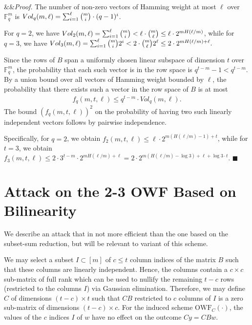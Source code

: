 \documentclass[orivec,envcountsect]{llncs}
\renewenvironment{proof}[1][]
    {\noindent
       \ifx&#1&{\it Proof.}
       \else{\it Proof ({#1}).}
       \fi}{\hfill $\blacksquare$}
\newcommand{\OWF}{\text{OWF}}
\begin{document}
\begin{proof}The number of non-zero vectors of Hamming weight at most $\ell$ over $\mathbb{F}_q^m$ is
$Vol_q(m,\ell) = \sum_{i=1}^\ell \tbinom{m}{i} \cdot (q-1)^{i}$.

For $q = 2$, we have
$Vol_2(m,\ell) = \sum_{i=1}^\ell \tbinom{m}{i} <
\ell \cdot \tbinom{m}{\ell} \leq
\ell \cdot 2^{m H(\ell/m)}$, while for $q = 3$, we have
$Vol_3(m,\ell) = \sum_{i=1}^\ell \tbinom{m}{i} 2^i <
2 \cdot \tbinom{m}{\ell} 2^\ell \leq
2 \cdot 2^{m H(\ell/m) + \ell}.$

Since the rows of $B$ span a uniformly chosen linear subspace of dimension $t$ over $\mathbb{F}_q^m$, the probability that each such vector is in the row space is $q^{t-m} - 1 < q^{t-m}$. By a union bound over all vectors of Hamming weight bounded by $\ell$, the probability that there exists such a vector in the row space of $B$ is at most
\begin{align*}
f_q(m,t,\ell) \leq q^{t-m} \cdot Vol_q(m,\ell).
\end{align*}
The bound $(f_q(m,t,\ell))^2$ on the probability of having two such linearly independent vectors follows by pairwise independence.

Specifically, for $q = 2$, we obtain
$f_2(m,t,\ell) \leq \ell \cdot 2^{m (H(\ell/m) - 1) + t}$,
while for $t = 3$, we obtain
$f_3(m,t,\ell) \leq 2 \cdot 3^{t-m} \cdot 2^{m H(\ell/m) + \ell} = 2 \cdot 2^{m (H(\ell/m) - \log 3) + \ell + \log 3 \cdot t}$.
\end{proof}



\section{Attack on the 2-3 OWF Based on Bilinearity}
\label{app:bilinearity}

We describe an attack that in not more efficient than the one based on the subset-sum reduction, but will be relevant to variant of this scheme.


We may select a subset $I \subset [m]$ of $c \leq t$ column indices of the matrix $B$ such that these columns are linearly independent. Hence, the columns contain a $c \times c$ sub-matrix of full rank which can be used to nullify the remaining $t-c$ rows (restricted to the columns $I$) via Gaussian elimination. Therefore, we may define $C$ of dimensions $(t-c) \times t$ such that $CB$ restricted to $c$ columns of $I$ is a zero sub-matrix of dimensions $(t-c) \times c$. For the induced scheme $\OWF_C(\cdot)$, the values of the $c$ indices $I$ of $w$ have no effect on the outcome $Cy = CBw$.
\end{document}

